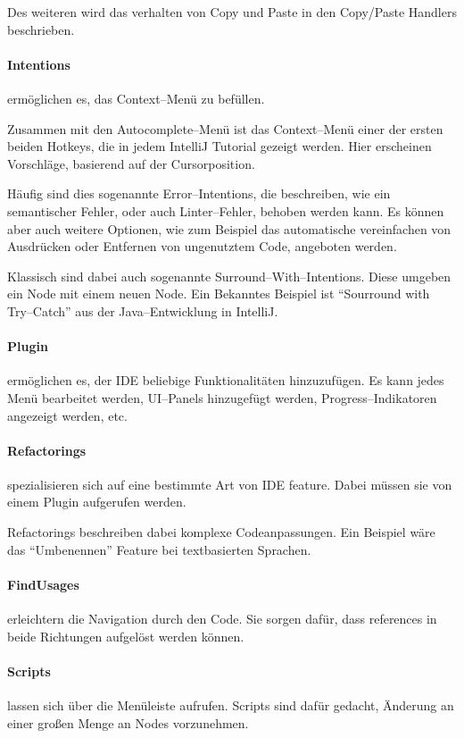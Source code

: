 Des weiteren wird das verhalten von Copy und Paste in den {\ttfamily Copy/Paste Handlers} beschrieben.

\paragraph{Intentions} ermöglichen es, das Context--Menü zu befüllen.

Zusammen mit den Autocomplete--Menü ist das Context--Menü einer der ersten beiden Hotkeys, die in jedem IntelliJ Tutorial gezeigt werden.
Hier erscheinen Vorschläge, basierend auf der Cursorposition.

Häufig sind dies sogenannte Error--Intentions, die beschreiben, wie ein semantischer Fehler, oder auch Linter--Fehler, behoben werden kann.
Es können aber auch weitere Optionen, wie zum Beispiel das automatische vereinfachen von Ausdrücken oder Entfernen von ungenutztem Code, angeboten werden.

Klassisch sind dabei auch sogenannte Surround--With--Intentions.
Diese umgeben ein Node mit einem neuen Node.
Ein Bekanntes Beispiel ist \enquote{Sourround with Try--Catch} aus der Java--Entwicklung in IntelliJ\@.

\paragraph{Plugin} ermöglichen es, der \ac{IDE} beliebige Funktionalitäten hinzuzufügen.
Es kann jedes Menü bearbeitet werden, \ac{UI}--Panels hinzugefügt werden, Progress--Indikatoren angezeigt werden, etc.

\paragraph{Refactorings} spezialisieren sich auf eine bestimmte Art von \ac{IDE} feature.
Dabei müssen sie von einem Plugin aufgerufen werden.

Refactorings beschreiben dabei komplexe Codeanpassungen.
Ein Beispiel wäre das \enquote{Umbenennen} Feature bei textbasierten Sprachen.

\paragraph{FindUsages} erleichtern die Navigation durch den Code.
Sie sorgen dafür, dass {\ttfamily references} in beide Richtungen aufgelöst werden können.

\paragraph{Scripts} lassen sich über die Menüleiste aufrufen.
Scripts sind dafür gedacht, Änderung an einer großen Menge an Nodes vorzunehmen.


